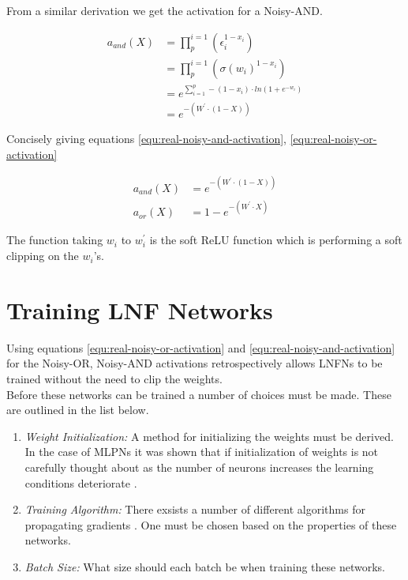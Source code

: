From a similar derivation we get the activation for a Noisy-AND.

\begin{align*}
a_{and}(X) &= \prod_{p}^{i=1} (\epsilon_i^{1 - x_i})\\
&= \prod_{p}^{i=1} (\sigma(w_i)^{1 - x_i})\\
&= e^{\sum^p_{i=1} -(1 - x_i) \cdot ln(1 + e^{-w_i})}\\
&= e^{-(W^{'} \cdot (1 - X))}
\end{align*}

Concisely giving equations \ref{equ:real-noisy-and-activation}, \ref{equ:real-noisy-or-activation}

\begin{align}
a_{and}(X) &= e^{-(W^{'} \cdot (1 - X))} \label{equ:real-noisy-and-activation}\\
a_{or}(X)&= 1 - e^{-(W^{'} \cdot X)} \label{equ:real-noisy-or-activation}
\end{align}

The function taking $w_i$ to $w_i^{'}$ is the soft ReLU function which is performing a soft clipping on the $w_i$'s. 

\section{Training LNF Networks}
Using equations \ref{equ:real-noisy-or-activation} and \ref{equ:real-noisy-and-activation} for the Noisy-OR, Noisy-AND activations retrospectively allows LNFNs to be trained without the need to clip the weights.\\

Before these networks can be trained a number of choices must be made. These are outlined in the list below.

\begin{enumerate}
	\item \textit{Weight Initialization:} A method for initializing the weights must be derived. In the case of MLPNs it was shown that if initialization of weights is not carefully thought about as the number of neurons increases the learning conditions deteriorate \cite{glorot2010understanding}.
	\item \textit{Training Algorithm:} There exsists a number of different algorithms for propagating gradients \cite{ruder2016overview}. One must be chosen based on the properties of these networks.
	\item \textit{Batch Size:} What size should each batch be when training these networks.
\end{enumerate}

